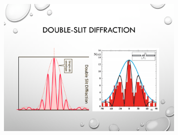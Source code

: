 \begin{figure}
\begin{subfigure}{0.475\textwidth}
\end{subfigure}
\hfill
\begin{subfigure}{0.475\textwidth}
\includegraphics[width=\textwidth]{education/ppt/13.png}
\end{subfigure}

\end{figure}
